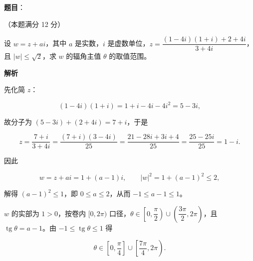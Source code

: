 \begin{answer}

\textbf{题目}：

（本题满分 12 分）

设 $w=z+ai$，其中 $a$ 是实数，$i$ 是虚数单位，$z=\dfrac{(1-4i)(1+i)+2+4i}{3+4i}$，且 $|w|\le\sqrt{2}$，求 $w$ 的辐角主值 $\theta$ 的取值范围。

\textbf{解析}

先化简 $z$：

\nopagebreak[4]
\[
(1-4i)(1+i)=1+i-4i-4i^{2}=5-3i,
\]

故分子为 $(5-3i)+(2+4i)=7+i$，于是

\nopagebreak[4]
\[
z=\frac{7+i}{3+4i}=\frac{(7+i)(3-4i)}{25}=\frac{21-28i+3i+4}{25}=\frac{25-25i}{25}=1-i.
\]

因此

\nopagebreak[4]
\[
w=z+ai=1+(a-1)i,\qquad |w|^{2}=1+(a-1)^{2}\le 2,
\]

解得 $(a-1)^{2}\le 1$，即 $0\le a\le 2$，从而 $-1\le a-1\le 1$。

$w$ 的实部为 $1>0$，按卷内 $[0,2\pi)$ 口径，$\theta\in\left[0,\dfrac{\pi}{2}\right)\cup\left(\dfrac{3\pi}{2},2\pi\right)$，且 $\operatorname{tg}\theta=a-1$。由 $-1\le\operatorname{tg}\theta\le 1$ 得

\nopagebreak[4]
\[
\theta\in\left[0,\frac{\pi}{4}\right]\cup\left[\frac{7\pi}{4},2\pi\right).
\]

\gkanswer{答案：$\theta\in\left[0,\dfrac{\pi}{4}\right]\cup\left[\dfrac{7\pi}{4},2\pi\right)$。}

\end{answer}
